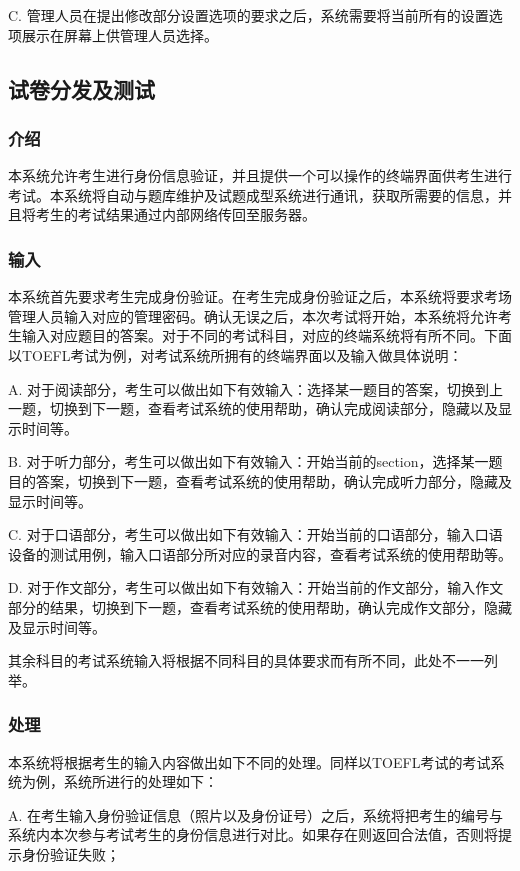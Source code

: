 C. 管理人员在提出修改部分设置选项的要求之后，系统需要将当前所有的设置选项展示在屏幕上供管理人员选择。


\subsection{试卷分发及测试}

\subsubsection{介绍}
本系统允许考生进行身份信息验证，并且提供一个可以操作的终端界面供考生进行考试。本系统将自动与题库维护及试题成型系统进行通讯，获取所需要的信息，并且将考生的考试结果通过内部网络传回至服务器。
	
\subsubsection{输入}
本系统首先要求考生完成身份验证。在考生完成身份验证之后，本系统将要求考场管理人员输入对应的管理密码。确认无误之后，本次考试将开始，本系统将允许考生输入对应题目的答案。对于不同的考试科目，对应的终端系统将有所不同。下面以TOEFL考试为例，对考试系统所拥有的终端界面以及输入做具体说明：

A. 对于阅读部分，考生可以做出如下有效输入：选择某一题目的答案，切换到上一题，切换到下一题，查看考试系统的使用帮助，确认完成阅读部分，隐藏以及显示时间等。

B. 对于听力部分，考生可以做出如下有效输入：开始当前的section，选择某一题目的答案，切换到下一题，查看考试系统的使用帮助，确认完成听力部分，隐藏及显示时间等。

C. 对于口语部分，考生可以做出如下有效输入：开始当前的口语部分，输入口语设备的测试用例，输入口语部分所对应的录音内容，查看考试系统的使用帮助等。

D. 对于作文部分，考生可以做出如下有效输入：开始当前的作文部分，输入作文部分的结果，切换到下一题，查看考试系统的使用帮助，确认完成作文部分，隐藏及显示时间等。

其余科目的考试系统输入将根据不同科目的具体要求而有所不同，此处不一一列举。

\subsubsection{处理}
本系统将根据考生的输入内容做出如下不同的处理。同样以TOEFL考试的考试系统为例，系统所进行的处理如下：

A. 在考生输入身份验证信息（照片以及身份证号）之后，系统将把考生的编号与系统内本次参与考试考生的身份信息进行对比。如果存在则返回合法值，否则将提示身份验证失败；

